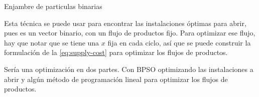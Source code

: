 \begin{algorithm}
  \caption{Enjambre de particulas binarias}
  \label{alg:bpso}
  \begin{algorithmic}[1]
          \label{alg:pso-opt}
        \EndFor
      \EndFor
    \EndFunction
  \end{algorithmic}
\end{algorithm}

Esta técnica se puede usar para encontrar las instalaciones óptimas para abrir,
pues es un vector binario, con un flujo de productos fijo. Para optimizar ese
flujo, hay que notar que se tiene una $x$ fija en cada ciclo, así que se puede
construir la formulación de la \cref{eq:supply-cost} para optimizar los flujos
de productos.

Sería una optimización en dos partes. Con BPSO optimizando las instalaciones
a abrir y algún método de programación lineal para optimizar los flujos de
productos.
